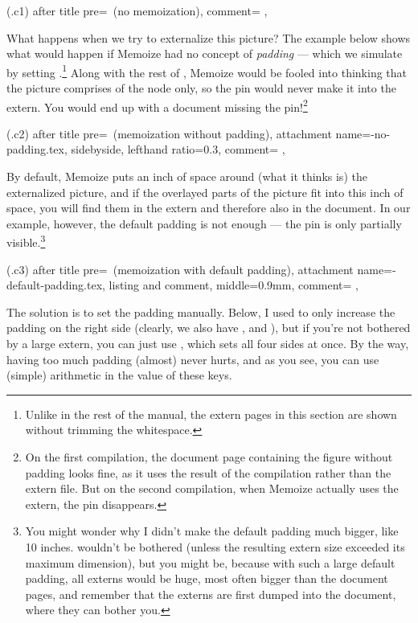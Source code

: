 \documentclass[a4paper,11pt]{article}
\begin{document}
(.c1){
  after title pre={\ (no memoization)},
  comment={\centering
  },
}

What happens when we try to externalize this picture?  The example below shows
what would happen if Memoize had no concept of \emph{padding} --- which we
simulate by setting .\footnote{Unlike in the rest of
  the manual, the extern pages in this section are shown without trimming the
  whitespace.}  Along with the rest of , Memoize would be fooled
into thinking that the picture comprises of the node only, so the pin would
never make it into the extern.  You would end up with a document missing the
pin!\footnote{On the first compilation, the document page containing the figure
  without padding looks fine, as it uses the result of the compilation rather
  than the extern file.  But on the second compilation, when Memoize actually
  uses the extern, the pin disappears.}

(.c2){
  after title pre={\ (memoization without padding)},
  attachment name=\examplename-no-padding.tex,
  sidebyside, lefthand ratio=0.3,
  comment={\centering
  },
}


By default, Memoize puts an inch of space around (what it thinks is) the
externalized picture, and if the overlayed parts of the picture fit into this
inch of space, you will find them in the extern and therefore also in the
document.  In our example, however, the default padding is not enough --- the
pin is only partially visible.\footnote{You might wonder why I didn't make the
  default padding much bigger, like 10 inches.   wouldn't be
  bothered (unless the resulting extern size exceeded its maximum dimension),
  but you might be, because with such a large default padding, all externs
  would be huge, most often bigger than the document pages, and remember that
  the externs are first dumped into the document, where they can bother you.}

(.c3){
  after title pre={\ (memoization with default padding)},
  attachment name=\examplename-default-padding.tex,
  listing and comment,
  middle=0.9mm,
  comment={\centering
  },
}

The solution is to set the padding manually.  Below, I used  to only increase the padding on the right side (clearly, we also have
,  and ), but
if you're not bothered by a large extern, you can just use
, which sets all four sides at once.  By the way, having
too much padding (almost) never hurts, and as you see, you can use (simple)
arithmetic in the value of these keys.
\end{document}
